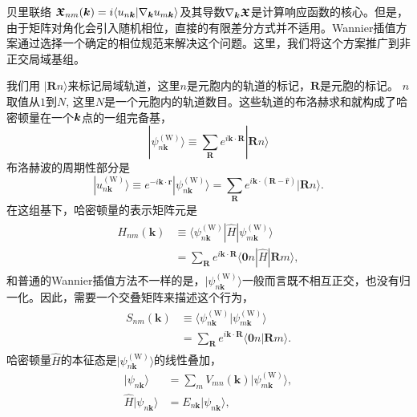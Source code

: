 贝里联络\cite{berry_quantal_1984} $\boldsymbol{\mathfrak{X}}_{nm}(\boldsymbol{k})=i\langle u_{n\boldsymbol{k}}|\nabla_{\boldsymbol{k}}u_{m\boldsymbol{k}}\rangle$及其导数$\nabla_{\boldsymbol{k}}\boldsymbol{\mathfrak{X}}$是计算响应函数的核心。但是，由于矩阵对角化会引入随机相位，直接的有限差分方式并不适用。Wannier插值方案通过选择一个确定的相位规范来解决这个问题。这里，我们将这个方案推广到非正交局域基组。

我们用 $|\boldsymbol{R}n\rangle$来标记局域轨道，这里$n$是元胞内的轨道的标记，$\boldsymbol{R}$是元胞的标记。 $n$取值从$1$到$N$, 这里$N$是一个元胞内的轨道数目。这些轨道的布洛赫求和就构成了哈密顿量在一个$\boldsymbol{k}$点的一组完备基，
\[
|\psi_{n\boldsymbol{k}}^{(\text{W})}\rangle\equiv\sum_{\boldsymbol{R}}e^{i\boldsymbol{k}\cdot\boldsymbol{R}}|\boldsymbol{R}n\rangle
\]
布洛赫波的周期性部分是 
\[
|u_{n\boldsymbol{k}}^{(\text{W})}\rangle\equiv e^{-i\boldsymbol{k}\cdot\hat{\boldsymbol{r}}}|\psi_{n\boldsymbol{k}}^{(\text{W})}\rangle=\sum_{\boldsymbol{R}}e^{i\boldsymbol{k}\cdot(\boldsymbol{R}-\hat{\boldsymbol{r}})}|\boldsymbol{R}n\rangle.
\]
在这组基下，哈密顿量的表示矩阵元是
\begin{align}
\begin{split}
H_{nm}(\boldsymbol{k}) & \equiv\langle\psi_{n\boldsymbol{k}}^{(\text{W})}|\hat{H}|\psi_{m\boldsymbol{k}}^{(\text{W})}\rangle\\
& =\sum_{\boldsymbol{R}}e^{i\boldsymbol{k}\cdot\boldsymbol{R}}\langle\boldsymbol{0}n|\hat{H}|\boldsymbol{R}m\rangle,
\end{split}
\end{align}
和普通的Wannier插值方法不一样的是，$|\psi_{n\boldsymbol{k}}^{(\text{W})}\rangle$一般而言既不相互正交，也没有归一化。因此，需要一个交叠矩阵来描述这个行为，
\begin{align}
\begin{split}
S_{nm}(\boldsymbol{k}) & \equiv\langle\psi_{n\boldsymbol{k}}^{(\text{W})}|\psi_{m\boldsymbol{k}}^{(\text{W})}\rangle\\
& =\sum_{\boldsymbol{R}}e^{i\boldsymbol{k}\cdot\boldsymbol{R}}\langle\boldsymbol{0}n|\boldsymbol{R}m\rangle.\label{S}
\end{split}
\end{align}
哈密顿量$\hat{H}$的本征态是$|\psi_{n\boldsymbol{k}}^{(\text{W})}\rangle$的线性叠加，
\begin{align}
|\psi_{n\boldsymbol{k}}\rangle & =\sum_{m}V_{mn}(\boldsymbol{k})|\psi_{m\boldsymbol{k}}^{(\text{W})}\rangle,\\
\hat{H}|\psi_{n\boldsymbol{k}}\rangle & =E_{n\boldsymbol{k}}|\psi_{n\boldsymbol{k}}\rangle,
\end{align}

